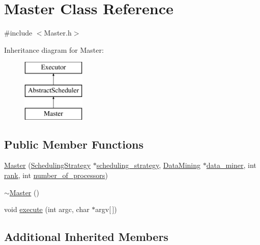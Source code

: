 \hypertarget{class_master}{}\section{Master Class Reference}
\label{class_master}


{\ttfamily \#include $<$Master.\+h$>$}

Inheritance diagram for Master\+:\begin{figure}[H]
\begin{center}
\leavevmode
\includegraphics[height=3.000000cm]{class_master}
\end{center}
\end{figure}
\subsection*{Public Member Functions}
\begin{DoxyCompactItemize}
\item 
\hyperlink{class_master_a4ffd1a0c99fc39712ac89c50f87dedfa}{Master} (\hyperlink{class_scheduling_strategy}{Scheduling\+Strategy} $\ast$\hyperlink{class_abstract_scheduler_a7dd11eee79bfb44c820d6c28480fd0c7}{scheduling\+\_\+strategy}, \hyperlink{class_data_mining}{Data\+Mining} $\ast$\hyperlink{class_abstract_scheduler_a6e281d90fa4b965779cd13eabf7d0249}{data\+\_\+miner}, int \hyperlink{class_executor_a33c24e2887b4d9c4ef7f3566d3bc803e}{rank}, int \hyperlink{class_executor_a4e798bde66d26fe200de7e8d2b54e915}{number\+\_\+of\+\_\+processors})
\item 
\hyperlink{class_master_a20f70958ed75532ba672af1b780f59eb}{$\sim$\+Master} ()
\item 
void \hyperlink{class_master_acea94dce898273bbbddfaae52f243bca}{execute} (int argc, char $\ast$argv\mbox{[}$\,$\mbox{]})
\end{DoxyCompactItemize}
\subsection*{Additional Inherited Members}


